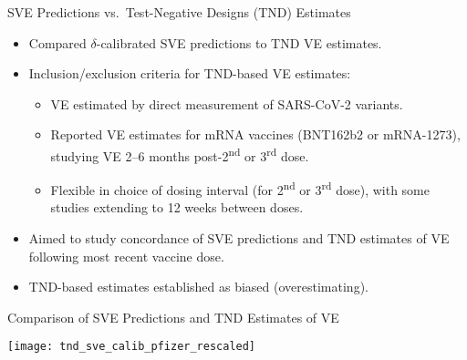 \documentclass{beamer}
\begin{document}

\begin{frame}[c]{SVE Predictions vs.~Test-Negative Designs (TND) Estimates}

\begin{center}
\begin{itemize}
  \itemsep6pt
  \item Compared $\delta$-calibrated SVE predictions to TND VE estimates.
  \item Inclusion/exclusion criteria for TND-based VE estimates\footnotemark:
    \begin{itemize}
      \itemsep2pt
      \item VE estimated by direct measurement of SARS-CoV-2 variants.
      \item Reported VE estimates for mRNA vaccines (BNT162b2 or mRNA-1273),
        studying VE 2--6 months post-2\textsuperscript{nd} or
        3\textsuperscript{rd} dose.
      \item Flexible in choice of dosing interval (for 2\textsuperscript{nd} or
        3\textsuperscript{rd} dose), with some studies extending to 12 weeks
        between doses.
    \end{itemize}
  \item Aimed to study concordance of SVE predictions and TND estimates of VE
    following most recent vaccine dose.
  \item TND-based estimates established as biased (overestimating).
\end{itemize}
\end{center}


\note{
}

\end{frame}


\begin{frame}[c]{Comparison of SVE Predictions and TND Estimates of VE}

\hspace*{-0.5cm}\texttt{[image: tnd\_sve\_calib\_pfizer\_rescaled]}

\note{
}

\end{frame}

\end{document}
